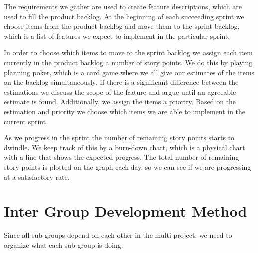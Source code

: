 The requirements we gather are used to create feature descriptions, which are used to fill the product backlog.
At the beginning of each succeeding sprint we choose items from the product backlog and move them to the sprint backlog, which is a list of features we expect to implement in the particular sprint.




In order to choose which items to move to the sprint backlog we assign each item currently in the product backlog a number of story points.
We do this by playing planning poker, which is a card game where we all give our estimates of the items on the backlog simultaneously.%
If there is a significant difference between the estimations we discuss the scope of the feature and argue until an agreeable estimate is found.
Additionally, we assign the items a priority.
Based on the estimation and priority we choose which items we are able to implement in the current sprint.

As we progress in the sprint the number of remaining story points starts to dwindle. 
We keep track of this by a burn-down chart, which is a physical chart with a line that shows the expected progress.
The total number of remaining story points is plotted on the graph each day, so we can see if we are progressing at a satisfactory rate.

\section{Inter Group Development Method}
Since all sub-groups depend on each other in the multi-project, we need to organize what each sub-group is doing.


